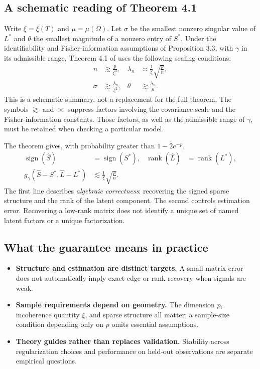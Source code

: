 \documentclass[11pt]{article}
\newcommand{\rank}{\operatorname{rank}}
\newcommand{\sign}{\operatorname{sign}}
\begin{document}
\subsection{A schematic reading of Theorem 4.1}
Write $\xi=\xi(T)$ and $\mu=\mu(\Omega)$. Let $\sigma$ be the smallest
nonzero singular value of $L^*$ and $\theta$ the smallest magnitude of a nonzero
entry of $S^*$. Under the identifiability and Fisher-information assumptions
of Proposition 3.3, with $\gamma$ in its admissible range, Theorem 4.1 of
\cite{cpw} uses the following scaling conditions:
\begin{align}
n&\gtrsim\frac{p}{\xi^4},
&\lambda_n&\asymp\frac{1}{\xi}\sqrt{\frac{p}{n}},\\
\sigma&\gtrsim\frac{\lambda_n}{\xi^2},
&\theta&\gtrsim\frac{\lambda_n}{\mu}.
\end{align}
This is a schematic summary, not a replacement for the full theorem.
The symbols $\gtrsim$ and $\asymp$ suppress factors involving the covariance
scale and the Fisher-information constants. Those factors, as well as the
admissible range of $\gamma$, must be retained when checking a particular model.

The theorem gives, with probability greater than $1-2e^{-p}$,
\begin{align}
\sign(\widehat S)&=\sign(S^*),
&\rank(\widehat L)&=\rank(L^*),\\
g_\gamma(\widehat S-S^*,\widehat L-L^*)&\lesssim
\frac{1}{\xi}\sqrt{\frac{p}{n}}.
\end{align}
The first line describes \emph{algebraic correctness}: recovering the signed
sparse structure and the rank of the latent component. The second controls
estimation error. Recovering a low-rank matrix does not identify a unique set
of named latent factors or a unique factorization.

\subsection{What the guarantee means in practice}
\begin{itemize}
\item \textbf{Structure and estimation are distinct targets.} A small matrix
error does not automatically imply exact edge or rank recovery when signals
are weak.
\item \textbf{Sample requirements depend on geometry.} The dimension $p$,
incoherence quantity $\xi$, and sparse structure all matter; a sample-size
condition depending only on $p$ omits essential assumptions.
\item \textbf{Theory guides rather than replaces validation.} Stability across
regularization choices and performance on held-out observations are separate
empirical questions.
\end{itemize}
\end{document}
